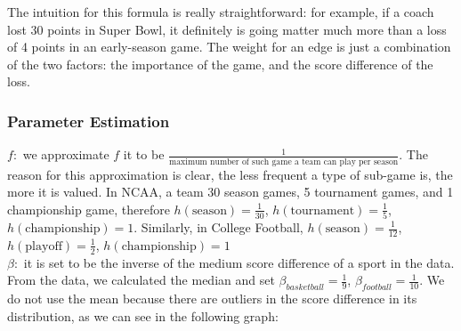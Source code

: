 \documentclass[titlepage]{article}
\begin{document}
\noindent The intuition for this formula is really straightforward: for example, if a coach lost 30 points in Super Bowl, it definitely is going matter much more than a loss of 4 points in an early-season game. The weight for an edge is just a combination of the two factors: the importance of the game, and the score difference of the loss.

\subsubsection*{Parameter Estimation}
\noindent $f:$ we approximate $f$ it to be $\frac{1}{\mbox{maximum number of such game a team can play per season}}$. The reason for this approximation is clear, the less frequent a type of sub-game is, the more it is valued. In NCAA, a team 30 season games, 5 tournament games, and 1 championship game, therefore $h(\mbox{season}) = \frac{1}{30}$, $h(\mbox{tournament}) = \frac{1}{5}$, $h(\mbox{championship}) = 1$. Similarly, in College Football, $h(\mbox{season}) = \frac{1}{12}$, $h(\mbox{playoff}) = \frac{1}{2}$, $h(\mbox{championship}) = 1$
\\

\noindent $\beta:$ it is set to be the inverse of the medium score difference of a sport in the data. From the data, we calculated the median and set $\beta_{basketball} = \frac{1}{9}$, $\beta_{football} = \frac{1}{10}$. We do not use the mean because there are outliers in the score difference in its distribution, as we can see in the following graph:
\\
\end{document}
